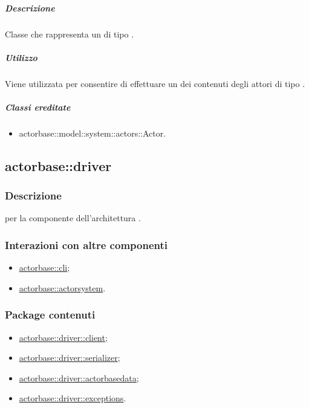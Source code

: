 \documentclass{scalatekids-article}
\begin{document}
\subparagraph{Descrizione}

Classe che rappresenta un  di tipo .

\subparagraph{Utilizzo}

Viene utilizzata per consentire di effettuare un  dei contenuti
degli attori di tipo .

\subparagraph{Classi ereditate}

\begin{itemize}
\item actorbase::model::system::actors::Actor.
\end{itemize}


\subsection{actorbase::driver}
\label{sec:actorbase::driver}

\subsubsection{Descrizione}

 per la componente  dell'architettura
.

\subsubsection{Interazioni con altre componenti}

\begin{itemize}
\item \hyperref[sec:actorbase::cli]{actorbase::cli};
\item \hyperref[sec:actorbase::actorsystem]{actorbase::actorsystem}.
\end{itemize}

\subsubsection{Package contenuti}

\begin{itemize}
\item \hyperref[sec:actorbase::driver::client]{actorbase::driver::client};
\item \hyperref[sec:actorbase::driver::serializer]{actorbase::driver::serializer};
\item \hyperref[sec:actorbase::driver::actorbasedata]{actorbase::driver::actorbasedata};
\item \hyperref[sec:actorbase::driver::exceptions]{actorbase::driver::exceptions}.
\end{itemize}
\end{document}

